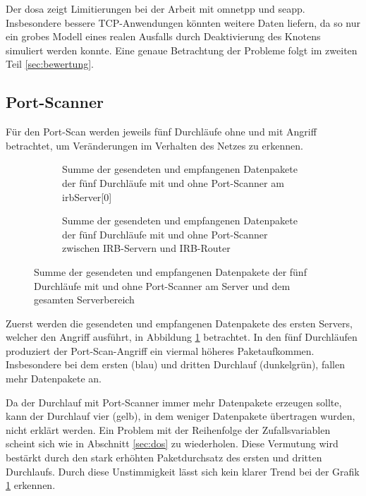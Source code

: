 Der \gls{dosa} zeigt Limitierungen bei der Arbeit mit \gls{omnetpp} und \gls{seapp}. Insbesondere bessere TCP-Anwendungen könnten weitere Daten liefern, da so nur ein grobes Modell eines realen Ausfalls durch Deaktivierung des Knotens simuliert werden konnte. Eine genaue Betrachtung der Probleme folgt im zweiten Teil \ref{sec:bewertung}.

\subsection{Port-Scanner}
Für den Port-Scan werden jeweils fünf Durchläufe ohne und mit Angriff betrachtet, um  Veränderungen im Verhalten des Netzes zu erkennen. 

\begin{figure}[ht]
	\centering
	\begin{subfigure}{0.45\textwidth}
		
		\caption[Paketaufkommen erster Server]{Summe der gesendeten und empfangenen Datenpakete der fünf Durchläufe mit und ohne Port-Scanner am irbServer[0]} 
		\label{fig:portAngriffThruput}
	\end{subfigure}
	\hfil
	\begin{subfigure}{0.45\textwidth}
		
		\caption[Paketaufkommen des IRB-Serverbereich]{Summe der gesendeten und empfangenen Datenpakete der fünf Durchläufe mit und ohne Port-Scanner zwischen IRB-Servern und IRB-Router} 
		\label{fig:paketaufkommenServerIrbZuRouter}
	\end{subfigure}
	\label{fig:sumPortScan}
	\caption[Port-Scanner Paketaufkommen]{Summe der gesendeten und empfangenen Datenpakete der fünf Durchläufe mit und ohne Port-Scanner am Server und dem gesamten Serverbereich}
\end{figure}

Zuerst werden die gesendeten und empfangenen Datenpakete des ersten Servers, welcher den Angriff ausführt, in Abbildung \ref{fig:portAngriffThruput} betrachtet. In den fünf Durchläufen produziert der Port-Scan-Angriff ein viermal höheres Paketaufkommen. Insbesondere bei dem ersten (blau) und dritten Durchlauf (dunkelgrün), fallen mehr Datenpakete an. 

Da der Durchlauf mit Port-Scanner immer mehr Datenpakete erzeugen sollte, kann der Durchlauf vier (gelb), in dem weniger Datenpakete übertragen wurden, nicht erklärt werden. Ein Problem mit der Reihenfolge der Zufallsvariablen scheint sich wie in Abschnitt \ref{sec:dos} zu wiederholen. Diese Vermutung wird bestärkt durch den stark erhöhten Paketdurchsatz des ersten und dritten Durchlaufs. Durch diese Unstimmigkeit lässt sich kein klarer Trend bei der Grafik \ref{fig:portAngriffThruput}  erkennen.

